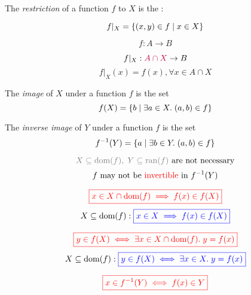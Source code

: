 
\begin{frame}{}
  \begin{definition}[Restriction]
    The {\it restriction} of a function $f$ to $X$ is the :

    \[
      f|_{X} = \{(x, y) \in f \mid x \in X\}
    \]
  \end{definition}

  \pause
  \[
    f: A \to B
  \]

  \pause
  \[
    f|_{X}: \textcolor{purple}{A \cap X} \to B
  \]
  \[
    f|_{X}(x) = f(x), \forall x \in A \cap X
  \]
\end{frame}

\begin{frame}{}
  \begin{definition}[像 (Image)]
    The {\it image} of $X$ under a function $f$ is the set
    \[
      {f(X) = \{b \mid \exists a \in X.\; (a, b) \in f\}}
    \]
  \end{definition}

  \vspace{0.50cm}
  \begin{definition}
    The {\it inverse image} of $Y$ under a function $f$ is the set
    \[
      {f^{-1}(Y) = \{a \mid \exists b \in Y.\; (a, b) \in f\}}
    \]
  \end{definition}

  \pause
  \[
    \textcolor{gray}{X \subseteq \dom(f),\; Y \subseteq \ran(f)}
    \text{ are not necessary}
  \]
  \pause
  \[
    f \text{ may not be \textcolor{red}{invertible} in } f^{-1}(Y)
  \]
\end{frame}

\begin{frame}{}
  \[
    \textcolor{red}{\boxed{x \in X \cap \text{dom}(f) \implies f(x) \in f(X)}}
  \]
  \pause
  \[
    X \subseteq \text{dom}(f): \textcolor{blue}{\boxed{x \in X \implies f(x) \in f(X)}}
  \]

  \pause
  \vspace{0.60cm}
  \[
    \textcolor{red}{\boxed{y \in f(X) \iff \exists x \in X \cap \text{dom}(f).\; y = f(x)}}
  \]
  \pause
  \[
    X \subseteq \text{dom}(f): \textcolor{blue}{\boxed{y \in f(X) \iff \exists x \in X.\; y = f(x)}}
  \]

  \vspace{0.60cm}
  \[
    \textcolor{red}{\boxed{x \in f^{-1}(Y) \iff f(x) \in Y}}
  \]
\end{frame}

